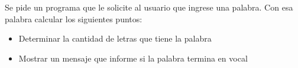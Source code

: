 Se pide un programa que le solicite al usuario que ingrese una palabra. Con esa palabra calcular los siguientes puntos:

\begin{itemize}
	\item Determinar la cantidad de letras que tiene  la palabra
	\item Mostrar un mensaje que informe si la palabra termina en vocal
\end{itemize}